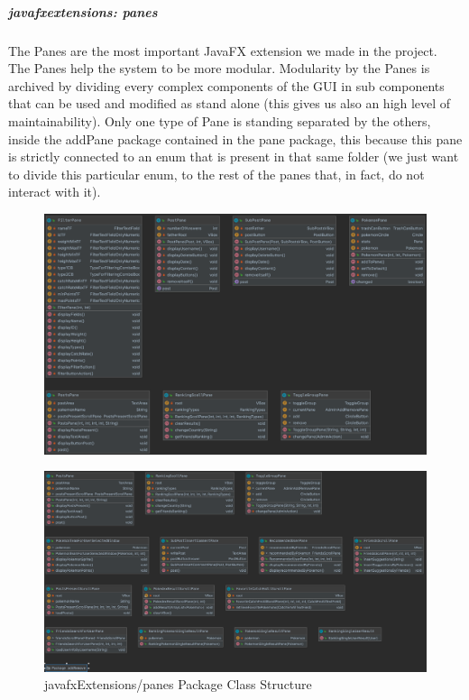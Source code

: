 \subparagraph{javafxextensions: panes}
The Panes are the most important JavaFX extension we made in the project. The Panes help the system to be more modular. Modularity by the Panes is archived by dividing every complex components of the GUI in sub components that can be used and modified as stand alone (this gives us also an high level of maintainability). Only one type of Pane is standing separated by the others, inside the addPane package contained in the pane package, this because this pane is strictly connected to an enum that is present in that same folder (we just want to divide this particular enum, to the rest of the panes that, in fact, do not interact with it). 
\begin{figure}[H]
	\centering
	\includegraphics[width=\textwidth]{img/javafx_panes_package.png}
\end{figure}
\begin{figure}[H]
	\centering
	\includegraphics[width=\textwidth]{img/javafx_panes_package2.png}
	\caption{javafxExtensions/panes Package Class Structure}
\end{figure}
\begingroup
